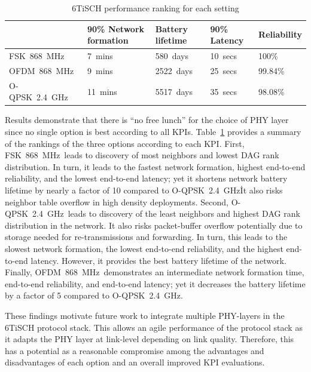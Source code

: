 \documentclass[sensors,article,submit,moreauthors,pdftex]{Definitions/mdpi}
\newcommand{\fsk}          {FSK~868~MHz}
\newcommand{\oqpsk}        {O-QPSK~2.4~GHz}
\newcommand{\ofdm}         {OFDM~868~MHz}
\begin{document}
\begin{table}
    \centering
    \begin{tabular}{|l|l|l|l|l|}
        \hline
                & 90\% Network formation & Battery lifetime & 90\% Latency  &  Reliability   \\ \hline
        \fsk\   & 7~mins                 & 580~days      & 10~secs       & 100\%             \\ \hline
        \ofdm\  & 9~mins                 & 2522~days     & 25~secs       & 99.84\%           \\ \hline
        \oqpsk\ & 11~mins                 & 5517~days     & 35~secs       & 98.08\%           \\ \hline
    \end{tabular}
    \caption{6TiSCH performance ranking for each setting}
    \label{tab:summary}
\end{table}


Results demonstrate that there is ``no free lunch'' for the choice of PHY layer since no single option is best according to all KPIs.
Table~\ref{tab:summary} provides a summary of the rankings of the three options according to each KPI.
First, \fsk\ leads to discovery of most neighbors and lowest DAG rank distribution.
In turn, it leads to the fastest network formation, highest end-to-end reliability, and the lowest end-to-end latency; yet it shortens network battery lifetime by nearly a factor of 10 compared to \oqpsk\. 
It also risks neighbor table overflow in high density deployments.
Second, \oqpsk\ leads to discovery of the least neighbors and highest DAG rank distribution in the network.
It also risks packet-buffer overflow potentially due to storage needed for re-transmissions and forwarding.
In turn, this leads to the slowest network formation, the lowest end-to-end reliability, and the highest end-to-end latency.
However, it provides the best battery lifetime of the network. 
Finally, \ofdm\ demonstrates an intermediate network formation time, end-to-end reliability, and end-to-end latency; yet  it decreases the battery lifetime by a factor of 5 compared to \oqpsk.


These findings motivate future work to integrate multiple PHY-layers in the 6TiSCH protocol stack.
This allows an agile performance of the protocol stack as it adapts the PHY layer at link-level depending on link quality.
Therefore, this has a potential as a reasonable compromise among the advantages and disadvantages of each option and an overall improved KPI evaluations. 

% 

\end{document}
